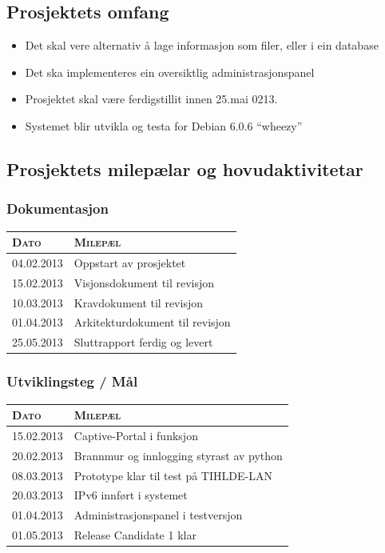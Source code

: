 \documentclass[nynorsk,12pt,a4paper]{article}
\begin{document}
\subsection{Prosjektets omfang}
\begin{itemize}
	\item Det skal vere alternativ å lage informasjon som filer, eller i ein database
	\item Det ska implementeres ein oversiktlig administrasjonspanel
	\item Prosjektet skal være ferdigstillit innen 25.mai 0213.
	\item Systemet blir utvikla og testa for Debian 6.0.6 “wheezy”
\end{itemize}

\subsection{Prosjektets milepælar og hovudaktivitetar}

\subsubsection{Dokumentasjon}
\begin{table}[h!]
	\begin{tabular}{ l l } 
		\textsc{Dato} & \textsc{Milepæl} \\ \hline
		04.02.2013 & Oppstart av prosjektet \\ 
		15.02.2013 & Visjonsdokument til revisjon	\\ 
		10.03.2013 & Kravdokument til revisjon	\\ 
		01.04.2013 & Arkitekturdokument til revisjon \\ 
		25.05.2013 & Sluttrapport ferdig og levert	\\ 
		\hline
	\end{tabular}
\end{table}

\subsubsection{Utviklingsteg / Mål}
\begin{table}[h!]
	\begin{tabular}{ l l }
		\textsc{Dato} & \textsc{Milepæl} \\ \hline
		15.02.2013 & Captive-Portal i funksjon \\ 
		20.02.2013 & Brannmur og innlogging styrast av python	\\ 
		08.03.2013 & Prototype klar til test på TIHLDE-LAN \\ 
		20.03.2013 & IPv6 innført i systemet	\\ 
		01.04.2013 & Administrasjonspanel i testversjon \\ 
		01.05.2013 & Release Candidate 1 klar	\\ 
		\hline
	\end{tabular}
\end{table}
\end{document}
